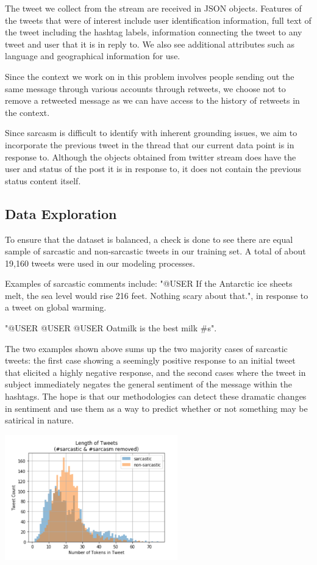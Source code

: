 \documentclass[11pt,a4paper]{article}
\begin{document}
The tweet we collect from the stream are received in JSON objects. Features of the tweets that were of interest include user identification information, full text of the tweet including the hashtag labels, information connecting the tweet to any tweet and user that it is in reply to. We also see additional attributes such as language and geographical information for use. 

Since the context we work on in this problem involves people sending out the same message through various accounts through retweets, we choose not to remove a retweeted message as we can have access to the history of retweets in the context.

Since sarcasm is difficult to identify with inherent grounding issues, we aim to incorporate the previous tweet in the thread that our current data point is in response to. Although the objects obtained from twitter stream does have the user and status of the post it is in response to, it does not contain the previous status content itself.

\subsection{Data Exploration}
To ensure that the dataset is balanced, a check is done to see there are equal sample of sarcastic and non-sarcastic tweets in our training set. A total of about 19,160 tweets were used in our modeling processes.

Examples of sarcastic comments include:
 "@USER If the Antarctic ice sheets melt, the sea level would rise 216 feet. Nothing scary about that.", in response to a tweet on global warming.   
 
 "@USER @USER @USER Oatmilk is the best milk \#s". 
 
 The two examples shown above sums up the two majority cases of sarcastic tweets: the first case showing a seemingly positive response to an initial tweet that elicited a highly negative response, and the second cases where the tweet in subject immediately negates the general sentiment of the message within the hashtags. The hope is that our methodologies can detect these dramatic changes in sentiment and use them as a way to predict whether or not something may be satirical in nature.


\includegraphics[width=75mm,scale=0.5]{token_histogram.png}
\end{document}
